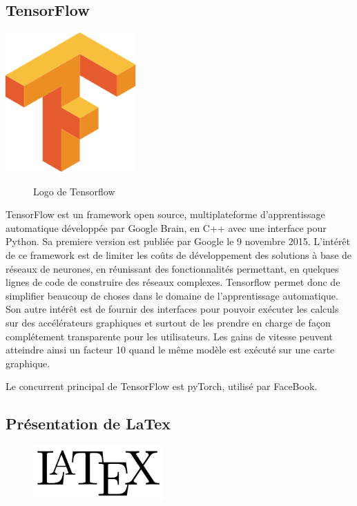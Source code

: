 \begin{itemize}
\hypertarget{Tensorflow}{%
\subsection{TensorFlow}%
\label{Tensorflow}}


\begin{center}
\label{fig:Tensorflow_logo}
\centering
\includegraphics[width=5cm]{./images/Tensorflow_logo.png}
\begin{figure}[h!]
\caption{Logo de Tensorflow}
\end{figure}
\end{center}


TensorFlow est un framework open source,
multiplateforme d'apprentissage automatique développée par Google Brain,
en C++ avec une interface pour Python.
Sa premiere version est publiée par Google le 9 novembre 2015.
L'intérêt de ce framework est de limiter les coûts de développement des solutions à base
de réseaux de neurones, en réunissant des fonctionnalités permettant,
en quelques lignes de code de construire des réseaux complexes.
Tensorflow permet donc de simplifier beaucoup de choses dans
le domaine de l'apprentissage automatique.
Son autre intérêt est de fournir des interfaces pour pouvoir exécuter les calculs sur
des accélérateurs graphiques et surtout de les prendre en charge
de façon complétement transparente pour les utilisateurs.
Les gains de vitesse peuvent atteindre ainsi un facteur 10 quand le même modèle est exécuté
sur une carte graphique.

Le concurrent principal de TensorFlow est pyTorch, utilisé par FaceBook.

\hypertarget{Pruxe9sentation-de-LaTex}{%
\subsection{Présentation de LaTex}
\label{Pruxe9sentation-de-LaTex}}

\begin{figure}[h]
  \begin{center}
\includegraphics[width=5cm]{./images/Latex.png}
\end{center}
\end{figure}


\end{itemize}
